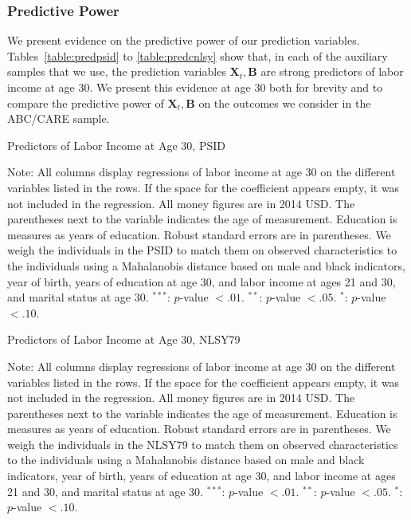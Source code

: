 \subsubsection{Predictive Power}

\noindent We present evidence on the predictive power of our prediction variables. Tables~\ref{table:predpsid} to \ref{table:predcnlsy} show that, in each of the auxiliary samples that we use, the prediction variables $\bm{X}_{t}, \bm{B}$ are strong predictors of labor income at age 30. We present this evidence at age 30 both for brevity and to compare the predictive power of $\bm{X}_{t},\bm{B}$ on the outcomes we consider in the ABC/CARE sample.

\begin{table}[H] 
\begin{threeparttable}
\caption{Predictors of Labor Income at Age 30, PSID}
\label{table:predpsid}
\centering 

\begin{tablenotes}
\footnotesize
\item Note: All columns display regressions of labor income at age 30 on the different variables listed in the rows. If the space for the coefficient appears empty, it was not included in the regression. All money figures are in 2014 USD. The parentheses next to the variable indicates the age of measurement. Education is measures as years of education. Robust standard errors are in parentheses. We weigh the individuals in the PSID to match them on observed characteristics to the individuals using a Mahalanobis distance based on male and black indicators, year of birth, years of education at age 30, and labor income at ages 21 and 30, and marital status at age 30. $^{***}$: $p$-value $< .01$. $^{**}$: $p$-value $< .05$. $^{*}$: $p$-value $< .10$.
\end{tablenotes}
\end{threeparttable}
\end{table}

\begin{table}[H] 
\begin{threeparttable}
\caption{Predictors of Labor Income at Age 30, NLSY79}
\label{table:prednlsy}
\centering 

\begin{tablenotes}
\footnotesize
\item Note: All columns display regressions of labor income at age 30 on the different variables listed in the rows. If the space for the coefficient appears empty, it was not included in the regression. All money figures are in 2014 USD. The parentheses next to the variable indicates the age of measurement. Education is measures as years of education. Robust standard errors are in parentheses. We weigh the individuals in the NLSY79 to match them on observed characteristics to the individuals using a Mahalanobis distance based on male and black indicators, year of birth, years of education at age 30, and labor income at ages 21 and 30, and marital status at age 30. $^{***}$: $p$-value $< .01$. $^{**}$: $p$-value $< .05$. $^{*}$: $p$-value $< .10$.
\end{tablenotes}
\end{threeparttable}
\end{table}

